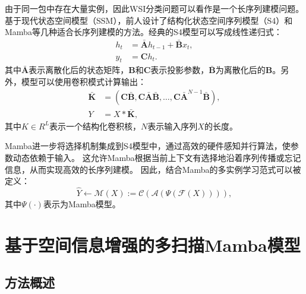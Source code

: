 由于同一包中存在大量实例，因此WSI分类问题可以看作是一个长序列建模问题。基于现代状态空间模型（SSM），前人设计了结构化状态空间序列模型（S4）和Mamba等几种适合长序列建模的方法。经典的S4模型可以写成线性递归式：
\begin{equation}
  \begin{aligned}
    h_t&=\mathbf{\bar{A}}h_{t-1}+\mathbf{\bar{B}}x_{t},\\
    y_t&=\mathbf{C}h_t.
  \end{aligned}
  \label{eq32}
  \end{equation}
其中$\mathbf{\bar{A}}$表示离散化后的状态矩阵，$\mathbf{B}$和$\mathbf{C}$表示投影参数，$\mathbf{\bar{B}}$为离散化后的$\mathbf{B}$。另外，模型可以使用卷积模式计算输出：
\begin{equation}
  \begin{aligned}
      \bar{\mathbf{K}}&=(\mathbf{C\bar{B},C\bar{A}\bar{B}},\dots,\mathbf{C}\bar{\mathbf{A}}^{N-1}\bar{\mathbf{B}}),\\
      Y&=X*\bar{\mathbf{K}},
  \end{aligned}
  \label{eq33}
  \end{equation}
其中$K\in R^L$表示一个结构化卷积核，$N$表示输入序列$X$的长度。

Mamba进一步将选择机制集成到S4模型中，通过高效的硬件感知并行算法，使参数动态依赖于输入。
这允许Mamba根据当前上下文有选择地沿着序列传播或忘记信息，从而实现高效的长序列建模。
因此，结合Mamba的多实例学习范式可以被定义：
\begin{equation}
  \hat{Y} \leftarrow \mathcal{M}\left(X\right):=\mathcal{C}(\mathcal{A}(\Psi(\mathcal{F}(X)))),
\end{equation}
其中$\Psi\left(\cdot\right)$表示为Mamba模型。


\section[\hspace{-2pt}基于空间信息增强的多扫描Mamba模型]{{\heiti{} \hspace{-8pt}基于空间信息增强的多扫描Mamba模型}}\label{section3: 基于空间信息增强的多扫描Mamba模型}

\subsection[\hspace{-2pt}方法概述]{{\heiti{} \hspace{-8pt}方法概述}}\label{section3: 方法概述}

